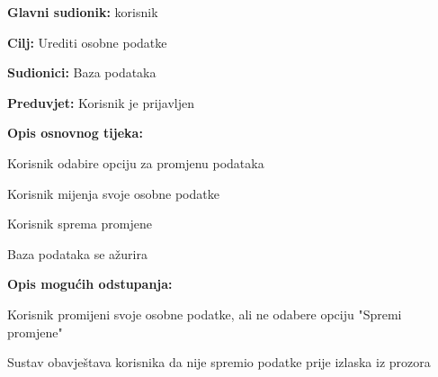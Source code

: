 					\noindent {}
					\begin{packed_item}
	
						\item \textbf{Glavni sudionik: }korisnik
						\item  \textbf{Cilj:} Urediti osobne podatke
						\item  \textbf{Sudionici:} Baza podataka
						\item  \textbf{Preduvjet:} Korisnik je prijavljen
						\item  \textbf{Opis osnovnog tijeka:}
						
						\item[] \begin{packed_enum}
	
							\item Korisnik odabire opciju za promjenu podataka
							\item Korisnik mijenja svoje osobne podatke
							\item Korisnik sprema promjene
							\item Baza podataka se ažurira

						\end{packed_enum}
						
						\item  \textbf{Opis mogućih odstupanja:}
						
						\item[] \begin{packed_item}
	
							\item[2.a] Korisnik promijeni svoje osobne podatke, ali ne odabere opciju "Spremi promjene"
							\item[] \begin{packed_enum}
								
								\item Sustav obavještava korisnika da nije spremio podatke prije izlaska iz prozora
								
							\end{packed_enum}
							
						\end{packed_item}
					\end{packed_item}
					
